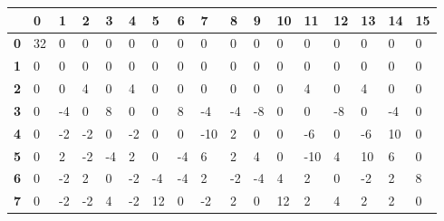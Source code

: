 \begin{longtable}[c]{|l|l|l|l|l|l|l|l|l|l|l|l|l|l|l|l|l|}
\hline
            & \textbf{0} & \textbf{1} & \textbf{2} & \textbf{3} & \textbf{4} & \textbf{5} & \textbf{6} & \textbf{7} & \textbf{8} & \textbf{9} & \textbf{10} & \textbf{11} & \textbf{12} & \textbf{13} & \textbf{14} & \textbf{15} \\ \hline
\endfirsthead
%
\endhead
%
\textbf{0}  & 32         & 0          & 0          & 0          & 0          & 0          & 0          & 0          & 0          & 0          & 0           & 0           & 0           & 0           & 0           & 0           \\ \hline
\textbf{1}  & 0          & 0          & 0          & 0          & 0          & 0          & 0          & 0          & 0          & 0          & 0           & 0           & 0           & 0           & 0           & 0           \\ \hline
\textbf{2}  & 0          & 0          & 4          & 0          & 4          & 0          & 0          & 0          & 0          & 0          & 0           & 4           & 0           & 4           & 0           & 0           \\ \hline
\textbf{3}  & 0          & -4         & 0          & 8          & 0          & 0          & 8          & -4         & -4         & -8         & 0           & 0           & -8          & 0           & -4          & 0           \\ \hline
\textbf{4}  & 0          & -2         & -2         & 0          & -2         & 0          & 0          & -10        & 2          & 0          & 0           & -6          & 0           & -6          & 10          & 0           \\ \hline
\textbf{5}  & 0          & 2          & -2         & -4         & 2          & 0          & -4         & 6          & 2          & 4          & 0           & -10         & 4           & 10          & 6           & 0           \\ \hline
\textbf{6}  & 0          & -2         & 2          & 0          & -2         & -4         & -4         & 2          & -2         & -4         & 4           & 2           & 0           & -2          & 2           & 8           \\ \hline
\textbf{7}  & 0          & -2         & -2         & 4          & -2         & 12         & 0          & -2         & 2          & 0          & 12          & 2           & 4           & 2           & 2           & 0           \\ \hline

\end{longtable}

